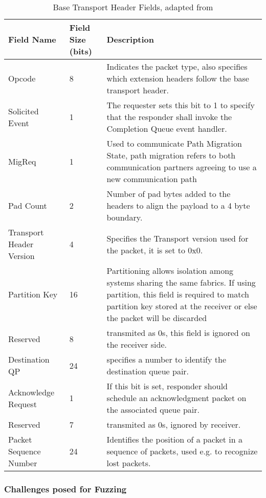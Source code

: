 \begin{table}[h]
  \begin{tabular}{| m{10em} | m{3em} | m{15em} |}
    \hline
    Field Name &  Field Size (bits) & Description\\
    \hline
    Opcode & 8 & Indicates the packet type, also specifies which extension headers follow the base transport header.\\
    \hline
    Solicited Event & 1 &  The requester sets this bit to 1 to specify that the responder shall invoke the Completion Queue event handler.\\
    \hline
    MigReq & 1 &  Used to communicate Path Migration State, path migration refers to both communication partners agreeing to use a new communication path\\
    \hline
    Pad Count & 2 &  Number of pad bytes added to the headers to align the payload to a 4 byte boundary.\\
    \hline
    Transport Header Version & 4 &  Specifies the Transport version used for the packet, it is set to 0x0.\\
    \hline
    Partition Key & 16 &  Partitioning allows isolation among systems sharing the same fabrics. If using partition, this field is required to match partition key stored at the receiver or else the packet will be discarded\\
    \hline
    Reserved & 8 &  transmited as 0s, this field is ignored on the receiver side.\\
    \hline
    Destination QP & 24 &  specifies a number to identify the destination queue pair.\\
    \hline
    Acknowledge Request & 1 &  If this bit is set, responder should schedule an acknowledgment packet on the associated queue pair.\\
    \hline
    Reserved & 7 &  transmited as 0s, ignored by receiver. \\
    \hline
    Packet Sequence Number & 24 &  Identifies the position of a packet in a sequence of packets, used e.g. to recognize lost packets.\\
    \hline
  \end{tabular}
  \caption[Base Transport Header Fields]{Base Transport Header Fields, adapted from\cite{infinibandvol107}}
  \label{tab:bthfields}
\end{table}

\subsubsection{Challenges posed for Fuzzing}\label{s:ibverbs-challenges}

